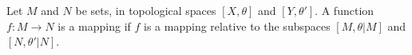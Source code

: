 Let $M$ and $N$ be sets, in topological spaces $[X, \theta]$ and $[Y, \theta']$. A function $f: M \rightarrow N$ is a mapping if $f$ is a mapping relative to the subspaces $[M, \theta|M]$ and $[N, \theta'|N]$.
